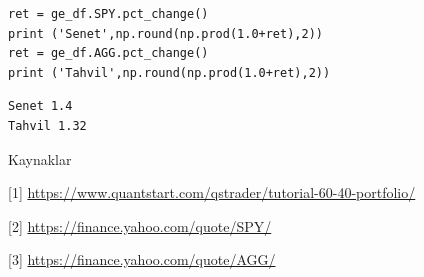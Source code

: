 \documentclass[12pt,fleqn]{article}\usepackage{../../common}
\begin{document}
\begin{verbatim}
ret = ge_df.SPY.pct_change()
print ('Senet',np.round(np.prod(1.0+ret),2))
ret = ge_df.AGG.pct_change()
print ('Tahvil',np.round(np.prod(1.0+ret),2))
\end{verbatim}

\begin{verbatim}
Senet 1.4
Tahvil 1.32
\end{verbatim}

Kaynaklar

[1] \url{https://www.quantstart.com/qstrader/tutorial-60-40-portfolio/}

[2] \url{https://finance.yahoo.com/quote/SPY/}

[3] \url{https://finance.yahoo.com/quote/AGG/}
  
\end{document}
